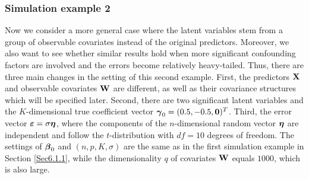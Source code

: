 \documentclass{statsoc}
\newcommand{\bW}{\mbox{\bf W}}
\newcommand{\bX}{\mbox{\bf X}}
\newcommand{\bzero}{\mbox{\bf 0}}
\newcommand{\bveps}{\mbox{\boldmath $\varepsilon$}}
\newcommand{\bbeta}{\mbox{\boldmath $\beta$}}
\newcommand{\bgamma}{\mbox{\boldmath $\gamma$}}
\newcommand{\bleta}{\mbox{\boldmath $\eta$}}
\def\t{^T}
\begin{document}
\subsubsection{Simulation example 2} \label{Sec6.1.2}
Now we consider a more general case where the latent variables stem from a group of observable covariates instead of the original predictors. Moreover, we also want to see whether similar results hold when more significant confounding factors are involved and the errors become relatively heavy-tailed. Thus, there are three main changes in the setting of this second example. First, the predictors $\bX$ and observable covariates $\bW$ are different, as well as their covariance structures which will be specified later. Second, there are two significant latent variables and the $K$-dimensional true coefficient vector $\bgamma_0 = (0.5, -0.5, \bzero)\t$. Third, the error vector $\bveps = \sigma \bleta$, where the components of the $n$-dimensional random vector $\bleta$ are independent and follow the $t$-distribution with $df = 10$ degrees of freedom. The settings of $\bbeta_0$ and $(n, p, K, \sigma)$ are the same as in the first simulation example in Section \ref{Sec6.1.1}, while the dimensionality $q$ of covariates $\bW$ equals $1000$, which is also large.
\end{document}
